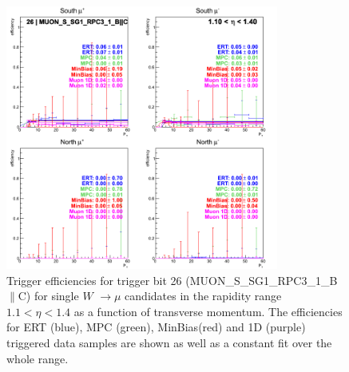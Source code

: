 \begin{figure}[ht]
\begin{center}
\includegraphics[width=0.8\textwidth]{./figures/run13_trigeffipt_eta0_trig26_lin.png}
\caption{\label{fig:run13_trigeffipt_eta0_nper0_trig26_lin} Trigger efficiencies for trigger bit 26 (MUON\_S\_SG1\_RPC3\_1\_B$\|$C) for single $W$ $\rightarrow \mu$ candidates in the rapidity range $ 1.1 < \eta < 1.4$ as a function of transverse momentum. The efficiencies for ERT (blue), MPC (green), MinBias(red) and 1D (purple) triggered data samples are shown as well as a constant fit over the whole range.}
\end{center}
\end{figure}

\clearpage


